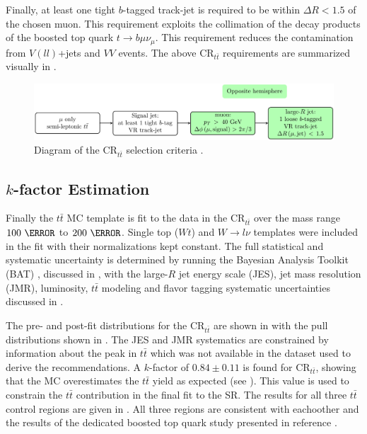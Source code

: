 Finally, at least one tight $b$-tagged track-jet is required to be within
$\Delta R < 1.5$ of the chosen muon.  This requirement exploits the collimation
of the decay products of the boosted top quark $t \rightarrow
b\mu\nu_{\mu}$.  This requirement reduces the contamination from $V(ll)$+jets
and $VV$ events. The above $\text{CR}_{t\bar{t}}$ requirements are summarized visually in .

\begin{figure}[!htbp]
\centering
\includegraphics[width=1.0\linewidth]{figures/backgrounds/ttbar_selection}
\caption{Diagram of the $\text{CR}_{t\bar{t}}$ selection criteria \cite {Feickert:2690521}.}
\label{sec:background:ttbar_selection_diagram}
\end{figure}

\subsection{$k$-factor Estimation}

Finally the $t\bar{t}$ MC template is fit to the data in the
$\text{CR}_{t\bar{t}}$ over the mass range $100~\GeV$ to $200~\GeV$.  Single
top ($Wt$) and $W \rightarrow l\nu$ templates were included in the fit with
their normalizations kept constant. The full statistical and systematic
uncertainty is determined by running the Bayesian Analysis Toolkit (BAT)
\cite{Beaujean:2011zz}, discussed in , with the large-$R$ jet
energy scale (JES), jet mass resolution (JMR), luminosity, $t\bar{t}$
modeling and flavor tagging systematic uncertainties discussed in
.

The pre- and post-fit distributions for the $\text{CR}_{t\bar{t}}$ are shown in
 with the pull distributions shown in
.  The JES and JMR systematics are constrained
by information about the peak in $t\bar{t}$ which was not available in the
dataset used to derive the recommendations. A $k$-factor of $0.84 \pm 0.11$ is
found for $\text{CR}_{t\bar{t}}$, showing that the MC overestimates the
$t\bar{t}$ yield as expected (see ). This
value is used to constrain the $t\bar{t}$ contribution in the final fit to the
SR. The results for all three $t\bar{t}$ control regions are given in
.  All three regions are consistent with eachoother
and the results of the dedicated boosted top quark study presented in reference
\cite{ATLAS:2016jct}.


